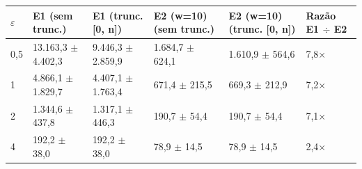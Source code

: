 \begin{tabular}{llllll}
\toprule
$\varepsilon$ & E1 (sem trunc.) & E1 (trunc. [0, n]) & E2 (w=10) (sem trunc.) & E2 (w=10) (trunc. [0, n]) & Razão E1 $\div$ E2 \\
\midrule
0,5 & 13.163,3 $\pm$ 4.402,3 & 9.446,3 $\pm$ 2.859,9 & 1.684,7 $\pm$ 624,1 & 1.610,9 $\pm$ 564,6 & 7,8$\times$ \\
1 & 4.866,1 $\pm$ 1.829,7 & 4.407,1 $\pm$ 1.763,4 & 671,4 $\pm$ 215,5 & 669,3 $\pm$ 212,9 & 7,2$\times$ \\
2 & 1.344,6 $\pm$ 437,8 & 1.317,1 $\pm$ 446,3 & 190,7 $\pm$ 54,4 & 190,7 $\pm$ 54,4 & 7,1$\times$ \\
4 & 192,2 $\pm$ 38,0 & 192,2 $\pm$ 38,0 & 78,9 $\pm$ 14,5 & 78,9 $\pm$ 14,5 & 2,4$\times$ \\
\bottomrule
\end{tabular}
